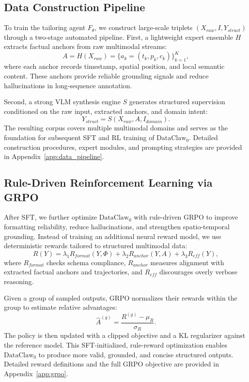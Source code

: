 \documentclass{llmxive}
\begin{document}
\subsection{Data Construction Pipeline}

To train the tailoring agent \(F_\theta\), we construct large-scale triplets \((X_{raw}, I, Y_{struct})\) through a two-stage automated pipeline. First, a lightweight expert ensemble \(H\) extracts factual anchors from raw multimodal streams:
\begin{equation}
A = H(X_{raw}) = \{a_k=(t_k,p_k,c_k)\}_{k=1}^{K},
\end{equation}
where each anchor records timestamp, spatial position, and local semantic content. These anchors provide reliable grounding signals and reduce hallucinations in long-sequence annotation.

Second, a strong VLM synthesis engine \(S\) generates structured supervision conditioned on the raw input, extracted anchors, and domain intent:
\begin{equation}
Y_{struct}=S(X_{raw}, A, I_{domain}).
\end{equation}
The resulting corpus covers multiple multimodal domains and serves as the foundation for subsequent SFT and RL training of $\text{DataClaw}_0$. Detailed construction procedures, expert modules, and prompting strategies are provided in Appendix~\ref{app:data_pipeline}.


\subsection{Rule-Driven Reinforcement Learning via GRPO}

After SFT, we further optimize $\text{DataClaw}_0$ with rule-driven GRPO to improve formatting reliability, reduce hallucinations, and strengthen spatio-temporal grounding. Instead of training an additional neural reward model, we use deterministic rewards tailored to structured multimodal data:
\begin{equation}
R(Y)=\lambda_1R_{format}(Y,\Phi)+\lambda_2R_{anchor}(Y,A)+\lambda_3R_{eff}(Y),
\end{equation}
where \(R_{format}\) checks schema compliance, \(R_{anchor}\) measures alignment with extracted factual anchors and trajectories, and \(R_{eff}\) discourages overly verbose reasoning.

Given a group of sampled outputs, GRPO normalizes their rewards within the group to estimate relative advantages:
\begin{equation}
\hat{A}^{(g)}=\frac{R^{(g)}-\mu_R}{\sigma_R}.
\end{equation}
The policy is then updated with a clipped objective and a KL regularizer against the reference model. This SFT-initialized, rule-reward optimization enables $\text{DataClaw}_0$ to produce more valid, grounded, and concise structured outputs. Detailed reward definitions and the full GRPO objective are provided in Appendix~\ref{app:grpo}.
\end{document}
